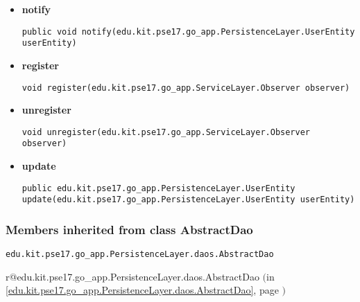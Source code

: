 \documentclass[11pt,a4paper]{report}
\makeatletter
\newcommand{\refdefined}[1]{
\expandafter\ifx\csname r@#1\endcsname\relax
\relax\else
{$($in \ref{#1}, page \pageref{#1}$)$}\fi}
\makeatother
\begin{document}
{{{{{{{{{{{{{{{{\begin{itemize}
{}%
\item{ 
\hypertarget{edu.kit.pse17.go_app.PersistenceLayer.daos.UserDaoImp.notify(edu.kit.pse17.go_app.PersistenceLayer.UserEntity)}{{\bf  notify}\\}
\begin{lstlisting}[frame=none]
public void notify(edu.kit.pse17.go_app.PersistenceLayer.UserEntity userEntity)\end{lstlisting} %
}%
\item{ 
\hypertarget{edu.kit.pse17.go_app.PersistenceLayer.daos.UserDaoImp.register(edu.kit.pse17.go_app.ServiceLayer.Observer)}{{\bf  register}\\}
\begin{lstlisting}[frame=none]
void register(edu.kit.pse17.go_app.ServiceLayer.Observer observer)\end{lstlisting} %
}%
\item{ 
\hypertarget{edu.kit.pse17.go_app.PersistenceLayer.daos.UserDaoImp.unregister(edu.kit.pse17.go_app.ServiceLayer.Observer)}{{\bf  unregister}\\}
\begin{lstlisting}[frame=none]
void unregister(edu.kit.pse17.go_app.ServiceLayer.Observer observer)\end{lstlisting} %
}%
\item{ 
\hypertarget{edu.kit.pse17.go_app.PersistenceLayer.daos.UserDaoImp.update(edu.kit.pse17.go_app.PersistenceLayer.UserEntity)}{{\bf  update}\\}
\begin{lstlisting}[frame=none]
public edu.kit.pse17.go_app.PersistenceLayer.UserEntity update(edu.kit.pse17.go_app.PersistenceLayer.UserEntity userEntity)\end{lstlisting} %
}%
\end{itemize}
}
\subsubsection{Members inherited from class AbstractDao }{
\texttt{edu.kit.pse17.go_app.PersistenceLayer.daos.AbstractDao} {\small 
\refdefined{edu.kit.pse17.go_app.PersistenceLayer.daos.AbstractDao}}
{\small 

}}}}}}}}}}}}}}}}}
\end{document}
